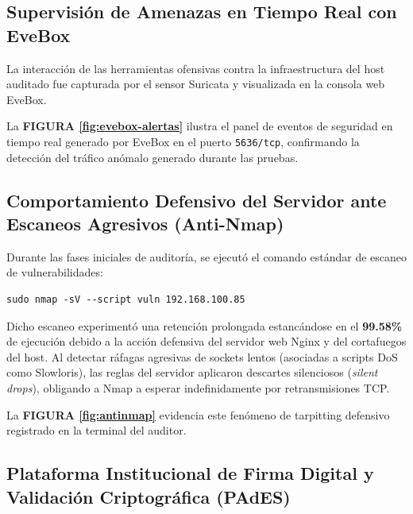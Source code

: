 \subsection{Supervisión de Amenazas en Tiempo Real con EveBox}

La interacción de las herramientas ofensivas contra la infraestructura del host auditado fue capturada por el sensor Suricata y visualizada en la consola web EveBox.

La \textbf{FIGURA \ref{fig:evebox-alertas}} ilustra el panel de eventos de seguridad en tiempo real generado por EveBox en el puerto \texttt{5636/tcp}, confirmando la detección del tráfico anómalo generado durante las pruebas.


\subsection{Comportamiento Defensivo del Servidor ante Escaneos Agresivos (Anti-Nmap)}

Durante las fases iniciales de auditoría, se ejecutó el comando estándar de escaneo de vulnerabilidades:
\begin{lstlisting}[style=terminal, caption={Comando Agresivo Inicial de Nmap}, label={lst:cmd-agresivo}]
sudo nmap -sV --script vuln 192.168.100.85
\end{lstlisting}

Dicho escaneo experimentó una retención prolongada estancándose en el \textbf{99.58\%} de ejecución debido a la acción defensiva del servidor web Nginx y del cortafuegos del host. Al detectar ráfagas agresivas de sockets lentos (asociadas a scripts DoS como Slowloris), las reglas del servidor aplicaron descartes silenciosos (\textit{silent drops}), obligando a Nmap a esperar indefinidamente por retransmisiones TCP.

La \textbf{FIGURA \ref{fig:antinmap}} evidencia este fenómeno de tarpitting defensivo registrado en la terminal del auditor.


\subsection{Plataforma Institucional de Firma Digital y Validación Criptográfica (PAdES)}

